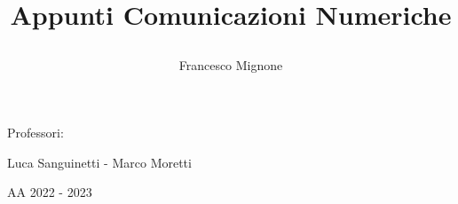 \title{\bf Appunti Comunicazioni Numeriche \par}
\author{Francesco Mignone}
\date{}
\begin{titlepage}

    \maketitle    

    \begin{center}
        Professori:


        Luca Sanguinetti - Marco Moretti

        \vfill

        AA 2022 - 2023
    \end{center}

\end{titlepage}
